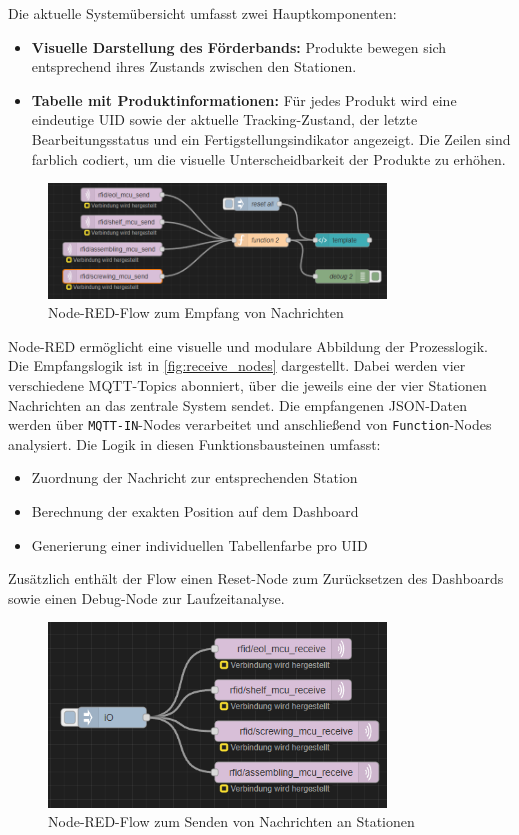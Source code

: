 Die aktuelle Systemübersicht umfasst zwei Hauptkomponenten:
\begin{itemize}
	\item \textbf{Visuelle Darstellung des Förderbands:} Produkte bewegen sich entsprechend ihres Zustands zwischen den Stationen.
	\item \textbf{Tabelle mit Produktinformationen:} Für jedes Produkt wird eine eindeutige UID sowie der aktuelle Tracking-Zustand, der letzte Bearbeitungsstatus und ein Fertigstellungsindikator angezeigt. Die Zeilen sind farblich codiert, um die visuelle Unterscheidbarkeit der Produkte zu erhöhen.
\end{itemize}

\begin{figure}[H]
	\centering
	\includegraphics[width=0.8\textwidth]{images/node-red-flow-receive.png}
	\caption{Node-RED-Flow zum Empfang von Nachrichten}
	\label{fig:receive_nodes}
\end{figure}

Node-RED ermöglicht eine visuelle und modulare Abbildung der Prozesslogik. Die Empfangslogik ist in \autoref{fig:receive_nodes} dargestellt. Dabei werden vier verschiedene MQTT-Topics abonniert, über die jeweils eine der vier Stationen Nachrichten an das zentrale System sendet. Die empfangenen JSON-Daten werden über \texttt{MQTT-IN}-Nodes verarbeitet und anschließend von \texttt{Function}-Nodes analysiert. Die Logik in diesen Funktionsbausteinen umfasst:
\begin{itemize}
	\item Zuordnung der Nachricht zur entsprechenden Station
	\item Berechnung der exakten Position auf dem Dashboard
	\item Generierung einer individuellen Tabellenfarbe pro UID
\end{itemize}

Zusätzlich enthält der Flow einen Reset-Node zum Zurücksetzen des Dashboards sowie einen Debug-Node zur Laufzeitanalyse.

\begin{figure}[H]
	\centering
	\includegraphics[width=0.8\textwidth]{images/node-red-flow-send.png}
	\caption{Node-RED-Flow zum Senden von Nachrichten an Stationen}
	\label{fig:send_nodes}
\end{figure}

